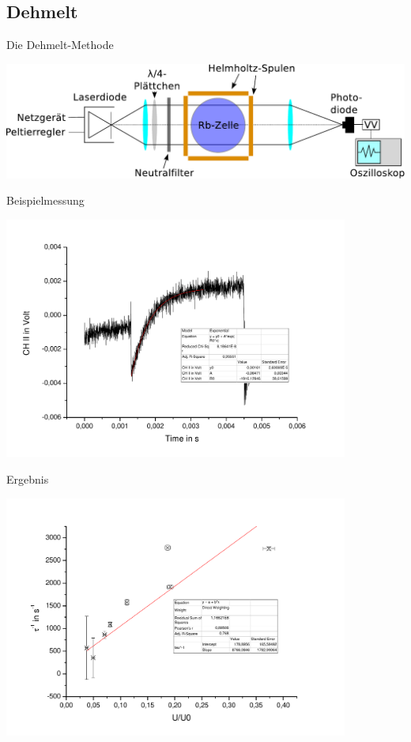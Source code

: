\documentclass{beamer}
\begin{document}
\subsection{Dehmelt}
\begin{frame}{Die Dehmelt-Methode}
\begin{center}
\centering \includegraphics[width=\textwidth]{Bilder/ABDehmelt.pdf}
\end{center}
\end{frame}

\begin{frame}{Beispielmessung}
\begin{center}
\centering \includegraphics[width=0.85\textwidth]{Bilder/DehmeltBsp.pdf}
\end{center}
\end{frame}

\begin{frame}{Ergebnis}
\begin{center}
\centering \includegraphics[width=0.85\textwidth]{Bilder/Dehmelt.pdf}
\end{center}
\end{frame}
\end{document}
